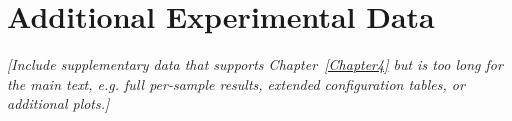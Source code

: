 \appendix

\chapter{Additional Experimental Data}
\label{Appendix1}

\textit{[Include supplementary data that supports Chapter~\ref{Chapter4} but
is too long for the main text, e.g. full per-sample results, extended
configuration tables, or additional plots.]}
